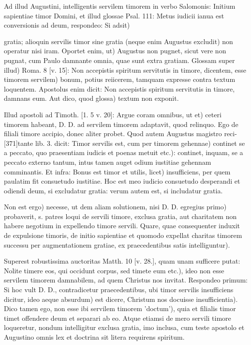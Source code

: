 Ad illud Augustini, intelligentis servilem timorem in verbo Salomonis: Initium sapientiae timor Domini, et illud glossae Psal. 111: Metus iudicii ianua est conversionis ad deum, respondeo: Si adsit)

gratia; alioquin servilis timor sine gratia (neque enim Augustus excludit) non operatur nisi iram. Oportet enim, ut) Augustus non pugnet, sicut vere non pugnat, cum Paulo damnante omnia, quae sunt extra gratiam. Glossam super illud) Roma. 8 [v. 15]: Non accepistis spiritum servitutis in timore, dicentem, esse timorem servilem) bonum, potius reiicerem, tamquam expresse contra textum loquentem. Apostolus enim dicit: Non accepistis spiritum servitutis in timore, damnans eum. Aut dico, quod glossa) textum non exponit.

Illud apostoli ad Timoth. [1. 5 v. 20]: Argue coram omnibus, ut et) ceteri timorem habeant, D. D. ad servilem timorem adaptavit, quod relinquo. Ego de filiali timore accipio, donec aliter probet. Quod autem Augustus magistro reci-[371]tante lib. 3. dicit: Timor servilis est, cum per timorem gehennae) continet se a peccato, quo praesentiam iudicis et poenas metuit etc.): continet, inquam, se a peccato externo tantum, intus tamen auget odium iustitiae gehennam comminantis. Et infra: Bonus est timor et utilis, licet) insufficiens, per quem paulatim fit consuetudo iustitiae. Hoc est meo iudicio consuetudo desperandi et odiendi deum, si excludatur gratia: verum autem est, si includatur gratia.

Non est ergo) necesse, ut dem aliam solutionem, nisi D. D. egregius primo) probaverit, s. patres loqui de servili timore, exclusa gratia, aut charitatem non habere negotium in expellendo timore servili. Quare, quae consequenter induxit de expulsione timoris, de initio sapientiae et quomodo expellat charitas timorem successu per augmentationem gratiae, ex praecedentibus satis intelliguntur).

Superest robustissima auctoritas Matth. 10 [v. 28.], quam unam sufficere putat: Nolite timere eos, qui occidunt corpus, sed timete eum etc.), ideo non esse servilem timorem damnabilem, ad quem Christus nos invitat. Respondeo primum: Si hoc vult D. D., contradicetur praecedentibus, ubi timor servilis insufficiens dicitur, ideo aeque absurdum) est dicere, Christum nos docuisse insufficientia). Dico tamen ego, non esse ibi servilem timorem 'doctum'), quia et filialis timor timet offendere deum et separari ab eo. Atque etiamsi de mero servili timore loqueretur, nondum intelligitur exclusa gratia, imo inclusa, cum teste apostolo et Augustino omnis lex et doctrina sit litera requirens spiritum.

